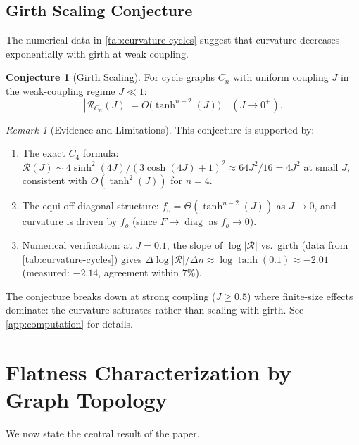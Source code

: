 \documentclass[11pt]{article}
\theoremstyle{definition}
\newtheorem{conjecture}[theorem]{Conjecture}
\theoremstyle{remark}
\newtheorem{remark}[theorem]{Remark}
\newcommand{\Fish}{F}
\newcommand{\diag}{\operatorname{diag}}
\newcommand{\Scal}{\mathcal{R}}
\begin{document}
\subsection{Girth Scaling Conjecture}
\label{subsec:girth-scaling}

The numerical data in \cref{tab:curvature-cycles} suggest that curvature
decreases exponentially with girth at weak coupling.

\begin{conjecture}[Girth Scaling]
\label{conj:girth}
For cycle graphs $C_n$ with uniform coupling $J$ in the weak-coupling
regime $J \ll 1$:
\begin{equation}
  |\Scal_{C_n}(J)| = O\bigl(\tanh^{n-2}(J)\bigr) \quad (J \to 0^+).
  \label{eq:girth-scaling}
\end{equation}
\end{conjecture}

\begin{remark}[Evidence and Limitations]
This conjecture is supported by:
\begin{enumerate}
\item The exact $C_4$ formula: $\Scal(J) \sim 4 \sinh^2(4J)/(3\cosh(4J)+1)^2
  \approx 64 J^2 / 16 = 4 J^2$ at small $J$, consistent with
  $O(\tanh^2(J))$ for $n = 4$.
\item The equi-off-diagonal structure: $f_o = \Theta(\tanh^{n-2}(J))$
  as $J \to 0$, and curvature is driven by $f_o$ (since $\Fish \to \diag$
  as $f_o \to 0$).
\item Numerical verification: at $J = 0.1$, the slope of $\log|\Scal|$
  vs.\ girth (data from \cref{tab:curvature-cycles}) gives
  $\Delta\log|\Scal|/\Delta n \approx \log\tanh(0.1) \approx -2.01$
  (measured: $-2.14$, agreement within $7\%$).
\end{enumerate}
The conjecture breaks down at strong coupling ($J \geq 0.5$) where
finite-size effects dominate: the curvature saturates rather than
scaling with girth. See \cref{app:computation} for details.
\end{remark}


\section{Flatness Characterization by Graph Topology}
\label{sec:vacuum}

We now state the central result of the paper.
\end{document}
